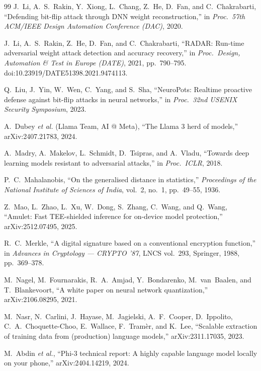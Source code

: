 \begin{thebibliography}{99}
J.~Li, A.~S.~Rakin, Y.~Xiong, L.~Chang, Z.~He, D.~Fan, and C.~Chakrabarti, ``Defending bit-flip
attack through DNN weight reconstruction,'' in \textit{Proc.\ 57th ACM/IEEE Design Automation
Conference (DAC)}, 2020.

J.~Li, A.~S.~Rakin, Z.~He, D.~Fan, and C.~Chakrabarti, ``RADAR: Run-time adversarial weight attack
detection and accuracy recovery,'' in \textit{Proc.\ Design, Automation \& Test in Europe (DATE)},
2021, pp.~790--795. doi:10.23919/DATE51398.2021.9474113.

Q.~Liu, J.~Yin, W.~Wen, C.~Yang, and S.~Sha, ``NeuroPots: Realtime proactive defense against
bit-flip attacks in neural networks,'' in \textit{Proc.\ 32nd USENIX Security Symposium}, 2023.

A.~Dubey \textit{et al.} (Llama Team, AI @ Meta), ``The Llama 3 herd of models,''
arXiv:2407.21783, 2024.

A.~Madry, A.~Makelov, L.~Schmidt, D.~Tsipras, and A.~Vladu, ``Towards deep learning models resistant
to adversarial attacks,'' in \textit{Proc.\ ICLR}, 2018.

P.~C.~Mahalanobis, ``On the generalised distance in statistics,'' \textit{Proceedings of the
National Institute of Sciences of India}, vol.~2, no.~1, pp.~49--55, 1936.

Z.~Mao, L.~Zhao, L.~Xu, W.~Dong, S.~Zhang, C.~Wang, and Q.~Wang, ``Amulet: Fast TEE-shielded
inference for on-device model protection,'' arXiv:2512.07495, 2025.

R.~C.~Merkle, ``A digital signature based on a conventional encryption function,'' in
\textit{Advances in Cryptology --- CRYPTO '87}, LNCS vol.~293, Springer, 1988, pp.~369--378.

M.~Nagel, M.~Fournarakis, R.~A.~Amjad, Y.~Bondarenko, M.~van~Baalen, and T.~Blankevoort, ``A white
paper on neural network quantization,'' arXiv:2106.08295, 2021.

M.~Nasr, N.~Carlini, J.~Hayase, M.~Jagielski, A.~F.~Cooper, D.~Ippolito, C.~A.~Choquette-Choo,
E.~Wallace, F.~Tram\`er, and K.~Lee, ``Scalable extraction of training data from (production)
language models,'' arXiv:2311.17035, 2023.

M.~Abdin \textit{et al.}, ``Phi-3 technical report: A highly capable language model locally on your
phone,'' arXiv:2404.14219, 2024.


\end{thebibliography}
